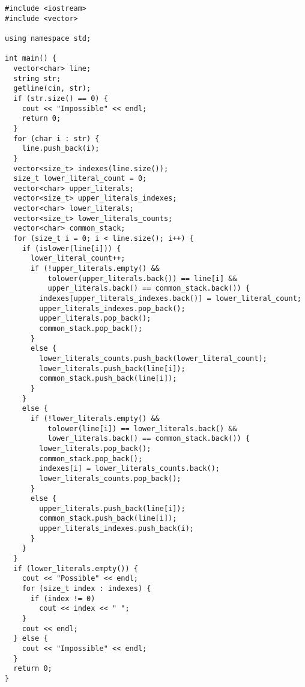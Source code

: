 \BgThispage
\newpage
\tiny
\begin{verbatim}
#include <iostream>
#include <vector>

using namespace std;

int main() {
  vector<char> line;
  string str;
  getline(cin, str);
  if (str.size() == 0) {
    cout << "Impossible" << endl;
    return 0;
  }
  for (char i : str) {
    line.push_back(i);
  }
  vector<size_t> indexes(line.size());
  size_t lower_literal_count = 0;
  vector<char> upper_literals;
  vector<size_t> upper_literals_indexes;
  vector<char> lower_literals;
  vector<size_t> lower_literals_counts;
  vector<char> common_stack;
  for (size_t i = 0; i < line.size(); i++) {
    if (islower(line[i])) {
      lower_literal_count++;
      if (!upper_literals.empty() &&
          tolower(upper_literals.back()) == line[i] &&
          upper_literals.back() == common_stack.back()) {
        indexes[upper_literals_indexes.back()] = lower_literal_count;
        upper_literals_indexes.pop_back();
        upper_literals.pop_back();
        common_stack.pop_back();
      }
      else {
        lower_literals_counts.push_back(lower_literal_count);
        lower_literals.push_back(line[i]);
        common_stack.push_back(line[i]);
      }
    }
    else {
      if (!lower_literals.empty() &&
          tolower(line[i]) == lower_literals.back() &&
          lower_literals.back() == common_stack.back()) {
        lower_literals.pop_back();
        common_stack.pop_back();
        indexes[i] = lower_literals_counts.back();
        lower_literals_counts.pop_back();
      }
      else {
        upper_literals.push_back(line[i]);
        common_stack.push_back(line[i]);
        upper_literals_indexes.push_back(i);
      }
    }
  }
  if (lower_literals.empty()) {
    cout << "Possible" << endl;
    for (size_t index : indexes) {
      if (index != 0)
        cout << index << " ";
    }
    cout << endl;
  } else {
    cout << "Impossible" << endl;
  }
  return 0;
}
\end{verbatim}
\normalsize
\BgThispage
\newpage

